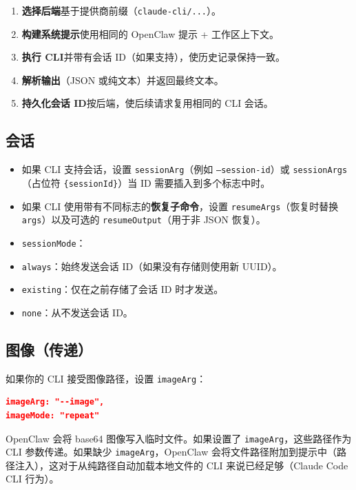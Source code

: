 \begin{enumerate}
  \item \textbf{选择后端}基于提供商前缀（\texttt{claude-cli/...}）。
  \item \textbf{构建系统提示}使用相同的 OpenClaw 提示 + 工作区上下文。
  \item \textbf{执行 CLI}并带有会话 ID（如果支持），使历史记录保持一致。
  \item \textbf{解析输出}（JSON 或纯文本）并返回最终文本。
  \item \textbf{持久化会话 ID}按后端，使后续请求复用相同的 CLI 会话。
\end{enumerate}


\subsection{会话}


\begin{itemize}
  \item 如果 CLI 支持会话，设置 \texttt{sessionArg}（例如 \texttt{--session-id}）或 \texttt{sessionArgs}（占位符 \texttt{\{sessionId\}}）当 ID 需要插入到多个标志中时。
  \item 如果 CLI 使用带有不同标志的\textbf{恢复子命令}，设置 \texttt{resumeArgs}（恢复时替换 \texttt{args}）以及可选的 \texttt{resumeOutput}（用于非 JSON 恢复）。
  \item \texttt{sessionMode}：
  \item \texttt{always}：始终发送会话 ID（如果没有存储则使用新 UUID）。
  \item \texttt{existing}：仅在之前存储了会话 ID 时才发送。
  \item \texttt{none}：从不发送会话 ID。
\end{itemize}


\subsection{图像（传递）}


如果你的 CLI 接受图像路径，设置 \texttt{imageArg}：

\begin{lstlisting}[language=json]
imageArg: "--image",
imageMode: "repeat"
\end{lstlisting}


OpenClaw 会将 base64 图像写入临时文件。如果设置了 \texttt{imageArg}，这些路径作为 CLI 参数传递。如果缺少 \texttt{imageArg}，OpenClaw 会将文件路径附加到提示中（路径注入），这对于从纯路径自动加载本地文件的 CLI 来说已经足够（Claude Code CLI 行为）。

